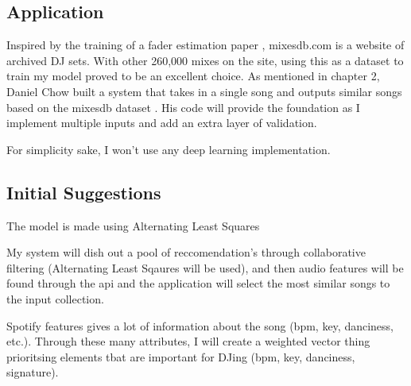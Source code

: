 \subsection{Application}

Inspired by the training of a fader estimation paper \citep{kim_automatic_2017}, mixesdb.com is a website of archived DJ sets. With other 260,000 mixes on the site, using this as a dataset to train my model proved to be an excellent choice. As mentioned in chapter 2, Daniel Chow built a system that takes in a single song and outputs similar songs based on the mixesdb dataset \citep{chow_music_2020}. His code will provide the foundation as I implement multiple inputs and add an extra layer of validation.

For simplicity sake, I won't use any deep learning implementation.

\subsection{Initial Suggestions}
The model is made using Alternating Least Squares


My system will dish out a pool of reccomendation's through collaborative filtering (Alternating Least Sqaures will be used), and then audio features will be found through the api and the application will select the most similar songs to the input collection. 

Spotify features gives a lot of information about the song (bpm, key, danciness, etc.). Through these many attributes, I will create a weighted vector thing prioritsing elements tbat are important for DJing (bpm, key, danciness, signature).

